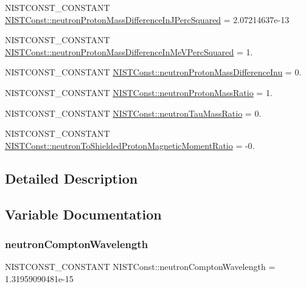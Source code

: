 \begin{DoxyCompactItemize}
\item 
N\+I\+S\+T\+C\+O\+N\+S\+T\+\_\+\+C\+O\+N\+S\+T\+A\+NT \mbox{\hyperlink{group___n_i_s_t_const-_neutron_gad9c0887872f150ac292cd709ed16f61e}{N\+I\+S\+T\+Const\+::neutron\+Proton\+Mass\+Difference\+In\+J\+Perc\+Squared}} = 2.\+07214637e-\/13
\item 
N\+I\+S\+T\+C\+O\+N\+S\+T\+\_\+\+C\+O\+N\+S\+T\+A\+NT \mbox{\hyperlink{group___n_i_s_t_const-_neutron_ga9a359902a1534f52c59d549c3165edb8}{N\+I\+S\+T\+Const\+::neutron\+Proton\+Mass\+Difference\+In\+Me\+V\+Perc\+Squared}} = 1.
\item 
N\+I\+S\+T\+C\+O\+N\+S\+T\+\_\+\+C\+O\+N\+S\+T\+A\+NT \mbox{\hyperlink{group___n_i_s_t_const-_neutron_gac808a9994102899511fafae56e842376}{N\+I\+S\+T\+Const\+::neutron\+Proton\+Mass\+Difference\+Inu}} = 0.
\item 
N\+I\+S\+T\+C\+O\+N\+S\+T\+\_\+\+C\+O\+N\+S\+T\+A\+NT \mbox{\hyperlink{group___n_i_s_t_const-_neutron_gaac7e4945038ee4c7ad0f4642b58d4c95}{N\+I\+S\+T\+Const\+::neutron\+Proton\+Mass\+Ratio}} = 1.
\item 
N\+I\+S\+T\+C\+O\+N\+S\+T\+\_\+\+C\+O\+N\+S\+T\+A\+NT \mbox{\hyperlink{group___n_i_s_t_const-_neutron_ga0694ef4af94520ba68040847c26b8f7f}{N\+I\+S\+T\+Const\+::neutron\+Tau\+Mass\+Ratio}} = 0.
\item 
N\+I\+S\+T\+C\+O\+N\+S\+T\+\_\+\+C\+O\+N\+S\+T\+A\+NT \mbox{\hyperlink{group___n_i_s_t_const-_neutron_gade519a41d92b6d1844a8ff1a24d5438f}{N\+I\+S\+T\+Const\+::neutron\+To\+Shielded\+Proton\+Magnetic\+Moment\+Ratio}} = -\/0.
\end{DoxyCompactItemize}


\subsection{Detailed Description}


\subsection{Variable Documentation}
\mbox{\label{group___n_i_s_t_const-_neutron_gae051f50a8d39fb52c5ce761f9b0696ae}} 
\subsubsection{\texorpdfstring{neutron\+Compton\+Wavelength}{neutronComptonWavelength}}
{\footnotesize\ttfamily N\+I\+S\+T\+C\+O\+N\+S\+T\+\_\+\+C\+O\+N\+S\+T\+A\+NT N\+I\+S\+T\+Const\+::neutron\+Compton\+Wavelength = 1.\+31959090481e-\/15}

